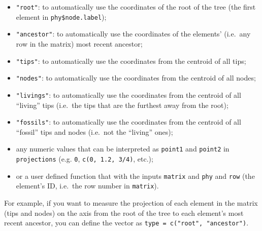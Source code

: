 \documentclass[]{book}
\providecommand{\tightlist}{%
  \setlength{\itemsep}{0pt}\setlength{\parskip}{0pt}}
\begin{document}
\begin{itemize}
\tightlist
\item
  \texttt{"root"}: to automatically use the coordinates of the root of the tree (the first element in \texttt{phy\$node.label});
\item
  \texttt{"ancestor"}: to automatically use the coordinates of the elements' (i.e.~any row in the matrix) most recent ancestor;
\item
  \texttt{"tips"}: to automatically use the coordinates from the centroid of all tips;
\item
  \texttt{"nodes"}: to automatically use the coordinates from the centroid of all nodes;
\item
  \texttt{"livings"}: to automatically use the coordinates from the centroid of all ``living'' tips (i.e.~the tips that are the furthest away from the root);
\item
  \texttt{"fossils"}: to automatically use the coordinates from the centroid of all ``fossil'' tips and nodes (i.e.~not the ``living'' ones);
\item
  any numeric values that can be interpreted as \texttt{point1} and \texttt{point2} in \texttt{projections} (e.g. \texttt{0}, \texttt{c(0,\ 1.2,\ 3/4)}, etc.);
\item
  or a user defined function that with the inputs \texttt{matrix} and \texttt{phy} and \texttt{row} (the element's ID, i.e.~the row number in \texttt{matrix}).
\end{itemize}

For example, if you want to measure the projection of each element in the matrix (tips and nodes) on the axis from the root of the tree to each element's most recent ancestor, you can define the vector as \texttt{type\ =\ c("root",\ "ancestor")}.
\end{document}

